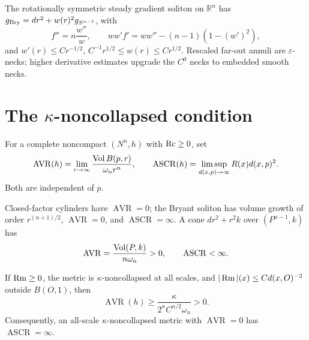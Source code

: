 \begin{example}
\label{ex:chow-iii-bryant-soliton}

The rotationally symmetric steady gradient soliton on $\mathbb R^n$ has
$g_{\rm Bry}=dr^2+w(r)^2g_{S^{n-1}}$, with
\[
f''=n\frac{w''}{w},\qquad ww'f'=ww''-(n-1)(1-(w')^2),
\]
and $w'(r)\le Cr^{-1/2}$, $C^{-1}r^{1/2}\le w(r)\le Cr^{1/2}$.  Rescaled
far-out annuli are $\varepsilon$-necks; higher derivative estimates upgrade
the $C^0$ necks to embedded smooth necks.
\end{example}

\section{\texorpdfstring{The $\kappa$-noncollapsed condition}{The Kappa-noncollapsed condition}}

\begin{definition}
\label{def:chow-iii-asymptotic-ratios}

For a complete noncompact $(N^n,h)$ with $\operatorname{Rc}\ge0$, set
\[
\operatorname{AVR}(h)=\lim_{r\to\infty}\frac{\operatorname{Vol} B(p,r)}{\omega_n r^n},
\qquad
\operatorname{ASCR}(h)=\limsup_{d(x,p)\to\infty}R(x)d(x,p)^2.
\]
Both are independent of $p$.
\end{definition}

\begin{example}
\label{ex:chow-iii-avr-ascr-examples}


Closed-factor cylinders have $\operatorname{AVR}=0$; the Bryant soliton has
volume growth of order $r^{(n+1)/2}$, $\operatorname{AVR}=0$, and
$\operatorname{ASCR}=\infty$.  A cone $dr^2+r^2k$ over $(P^{n-1},k)$ has
\[
\operatorname{AVR}=\frac{\operatorname{Vol}(P,k)}{n\omega_n}>0,
\qquad \operatorname{ASCR}<\infty.
\]
\end{example}

\begin{proposition}
\label{prop:chow-iii-avr-from-ascr}


If $\operatorname{Rm}\ge0$, the metric is $\kappa$-noncollapsed at all scales, and
$|\operatorname{Rm}|(x)\le Cd(x,O)^{-2}$ outside $B(O,1)$, then
\[
\operatorname{AVR}(h)\ge\frac{\kappa}{2^nC^{n/2}\omega_n}>0.
\]
Consequently, an all-scale $\kappa$-noncollapsed metric with $\operatorname{AVR}=0$
has $\operatorname{ASCR}=\infty$.
\end{proposition}

